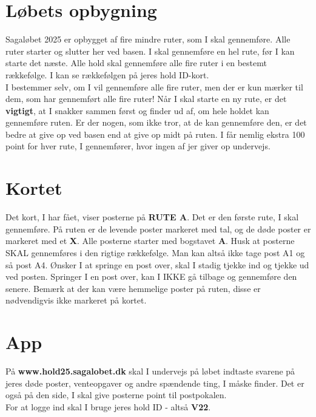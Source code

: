\section{Løbets opbygning}
Sagaløbet 2025 er opbygget af fire mindre ruter, som I skal gennemføre. Alle ruter starter og slutter her ved basen. I skal gennemføre en hel rute, før I kan starte det næste. Alle hold skal gennemføre alle fire ruter i en bestemt rækkefølge. I kan se rækkefølgen på jeres hold ID-kort.\\\newline
I bestemmer selv, om I vil gennemføre alle fire ruter, men der er kun mærker til dem, som har gennemført alle fire ruter! Når I skal starte en ny rute, er det \textbf{vigtigt}, at I snakker sammen først og finder ud af, om hele holdet kan gennemføre ruten. Er der nogen, som ikke tror, at de kan gennemføre den, er det bedre at give op ved basen end at give op midt på ruten. I får nemlig ekstra 100 point for hver rute, I gennemfører, hvor ingen af jer giver op undervejs.\\
\section{Kortet}
Det kort, I har fået, viser posterne på \textbf{RUTE A}. Det er den første rute, I skal gennemføre. På ruten er de levende poster markeret med tal, og de døde poster er markeret med et \textbf{X}. Alle posterne starter med bogstavet \textbf{A}. Husk at posterne SKAL gennemføres i den rigtige rækkefølge. Man kan altså ikke tage post A1 og så post A4. Ønsker I at springe en post over, skal I stadig tjekke ind og tjekke ud ved posten. Springer I en post over, kan I IKKE gå tilbage og gennemføre den senere. Bemærk at der kan være hemmelige poster på ruten, disse er nødvendigvis ikke markeret på kortet.
\section{App}
På \textbf{www.hold25.sagalobet.dk} skal I undervejs på løbet indtaste svarene på jeres døde poster, venteopgaver og andre spændende ting, I måske finder. Det er også på den side, I skal give posterne point til postpokalen.\\
For at logge ind skal I bruge jeres hold ID - altså \textbf{V22}.
\newpage
